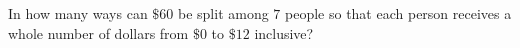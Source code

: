 In how many ways can $\$60$ be split among $7$ people so that each person receives a whole number of dollars from $\$0$ to $\$12$ inclusive?
